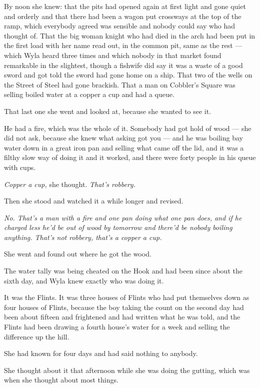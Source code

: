 By noon she knew: that the pits had opened again at first light and gone quiet and orderly and that there had been a wagon put crossways at the top of the ramp, which everybody agreed was sensible and nobody could say who had thought of. That the big woman knight who had died in the arch had been put in the first load with her name read out, in the common pit, same as the rest — which Wyla heard three times and which nobody in that market found remarkable in the slightest, though a fishwife did say it was a waste of a good sword and got told the sword had gone home on a ship. That two of the wells on the Street of Steel had gone brackish. That a man on Cobbler’s Square was selling boiled water at a copper a cup and had a queue.

That last one she went and looked at, because she wanted to see it.

He had a fire, which was the whole of it. Somebody had got hold of wood — she did not ask, because she knew what asking got you — and he was boiling bay water down in a great iron pan and selling what came off the lid, and it was a filthy slow way of doing it and it worked, and there were forty people in his queue with cups.

\textit{Copper a cup,} she thought. \textit{That’s robbery.}

Then she stood and watched it a while longer and revised.

\textit{No. That’s a man with a fire and one pan doing what one pan does, and if he charged less he’d be out of wood by tomorrow and there’d be nobody boiling anything. That’s not robbery, that’s a copper a cup.}

She went and found out where he got the wood.

\sceneBreak

The water tally was being cheated on the Hook and had been since about the sixth day, and Wyla knew exactly who was doing it.

It was the Flints. It was three houses of Flints who had put themselves down as four houses of Flints, because the boy taking the count on the second day had been about fifteen and frightened and had written what he was told, and the Flints had been drawing a fourth house’s water for a week and selling the difference up the hill.

She had known for four days and had said nothing to anybody.

She thought about it that afternoon while she was doing the gutting, which was when she thought about most things.

